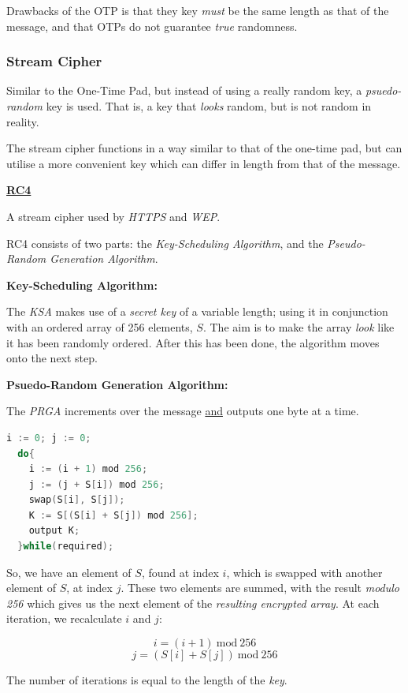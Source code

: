 \documentclass{article}
\begin{document}
Drawbacks of the OTP is that they key \textit{must} be the same length as that of the message, and that OTPs do not guarantee \textit{true} randomness.

\subsubsection{Stream Cipher}

Similar to the One-Time Pad, but instead of using a really random key, a \textit{psuedo-random} key is used. That is, a key that \textit{looks} random, but is not random in reality.

The stream cipher functions in a way similar to that of the one-time pad, but can utilise a more convenient key which can differ in length from that of the message.

\textbf{\underline{RC4}}

A stream cipher used by \textit{HTTPS} and \textit{WEP}.

RC4 consists of two parts: the \textit{Key-Scheduling Algorithm}, and the \textit{Pseudo-Random Generation Algorithm}.

\textbf{Key-Scheduling Algorithm:}

The \textit{KSA} makes use of a \textit{secret key} of a variable length; using it in conjunction with an ordered array of 256 elements, $S$. The aim is to make the array \textit{look} like it has been randomly ordered. After this has been done, the algorithm moves onto the next step.

\textbf{Psuedo-Random Generation Algorithm:}

The \textit{PRGA} increments over the message \underline{and} outputs one byte at a time.

\begin{lstlisting}[language=C]
  i := 0; j := 0;
  do{
    i := (i + 1) mod 256;
    j := (j + S[i]) mod 256;
    swap(S[i], S[j]);
    K := S[(S[i] + S[j]) mod 256];
    output K;
  }while(required);
\end{lstlisting}

So, we have an element of $S$, found at index $i$, which is swapped with another element of $S$, at index $j$. These two elements are summed, with the result \textit{modulo 256} which gives us the next element of the \textit{resulting encrypted array}. At each iteration, we recalculate $i$ and $j$:

\[ i = (i + 1)\:\text{mod}\:256\]
\[ j = (S[i] + S[j])\:\text{mod}\:256\]

The number of iterations is equal to the length of the \textit{key}.
\end{document}
